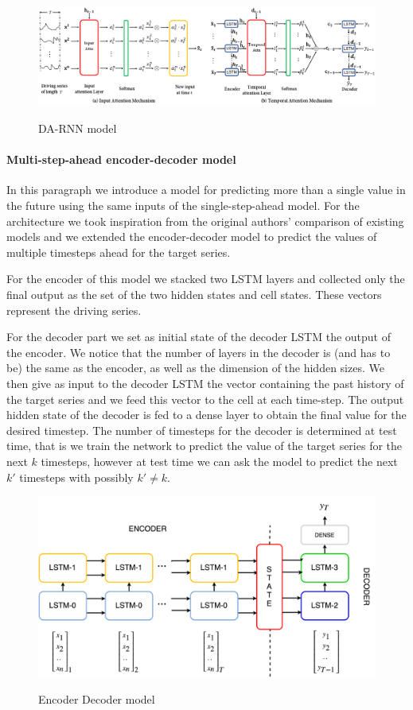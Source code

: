 \documentclass{article}
\begin{document}
\begin{figure}[ht]
\centering
\includegraphics[width=\linewidth]{img/da-rnn.png} \\
\caption{DA-RNN model}
\label{fig:da-rnn}
\end{figure}


\paragraph{Multi-step-ahead encoder-decoder model}

In this paragraph we introduce a model for predicting more than a single value in 
the future using the same inputs of the single-step-ahead model. 
For the architecture we took inspiration from the original authors' comparison of
existing models and we extended the encoder-decoder model to predict the values
of multiple timesteps ahead for the target series.

For the encoder of this model we stacked two LSTM layers and collected only the 
final output as the set of the two hidden states and cell states. These vectors
represent the driving series.

For the decoder part we set as initial state of the decoder LSTM the output of the
encoder. We notice that the number of layers in the decoder is (and has to be) the
same as the encoder, as well as the dimension of the hidden sizes. We then give as
input to the decoder LSTM the vector containing the past history of the target 
series and we feed this vector to the cell at each time-step. The output hidden
state of the decoder is fed to a dense layer to obtain the final value for the 
desired timestep. The number of timesteps for the decoder is determined at test
time, that is we train the network to predict the value of the target series for
the next $k$ timesteps, however at test time we can ask the model to predict the 
next $k'$ timesteps with possibly $k' \ne k$.

\begin{figure}[ht]
\centering
\includegraphics[width=0.7\linewidth]{img/ende-rnn.png} \\
\caption{Encoder Decoder model}
\label{fig:ende-rnn}
\end{figure}
\end{document}
